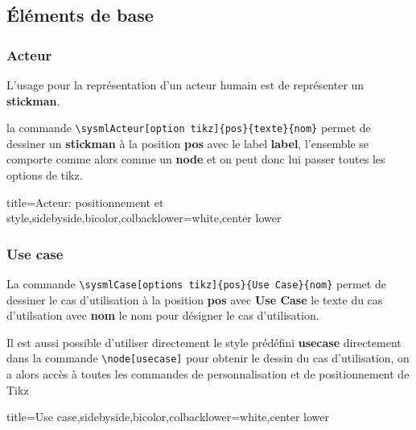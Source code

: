\documentclass[a4paper,11pt]{article}                      %
\begin{document}
\subsection{Éléments de base}



\subsubsection{Acteur}

L'usage pour la représentation d'un acteur humain est de représenter un \textbf{stickman}.

la commande  \verb!\sysmlActeur[option tikz]{pos}{texte}{nom}!  permet de dessiner un  \textbf{stickman}  à la position \textbf{pos}   avec le label \textbf{label}, l'ensemble se comporte comme alors comme un \textbf{node}  et on peut donc lui passer toutes les options de  tikz.

\begin{tcblisting}{title={Acteur: positionnement et style},sidebyside,bicolor,colbacklower=white,center lower}
\end{tcblisting}


\subsubsection{Use case}

La commande \verb!\sysmlCase[options tikz]{pos}{Use Case}{nom}!  permet de dessiner le cas d'utilisation à la position \textbf{pos}  avec \textbf{Use Case} le texte du cas d'utilsation  avec \textbf{nom}  le nom pour désigner le cas d'utilisation.

Il est aussi possible d'utiliser directement le style prédéfini \textbf{usecase} directement dans la commande  \verb!\node[usecase]!  pour obtenir le dessin du cas d'utilisation, on a alors accès à toutes les commandes de personnalisation et de positionnement de Tikz

\begin{tcblisting}{title={Use case},sidebyside,bicolor,colbacklower=white,center lower}
\end{tcblisting}
\end{document}
